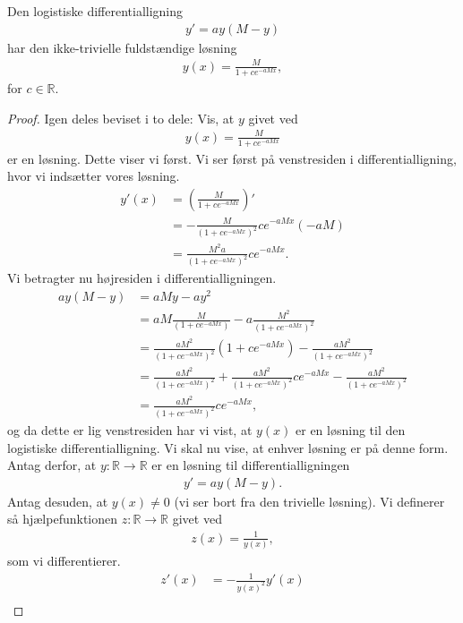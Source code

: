 \begin{setn}
	Den logistiske differentialligning
	\begin{align*}
		y' = ay(M-y)
	\end{align*}
	har den ikke-trivielle fuldstændige løsning
	\begin{align*}
		y(x) = \frac{M}{1+ce^{-aMx}},
	\end{align*}
	for $c\in \mathbb{R}$. 
\end{setn}
\begin{proof}
	Igen deles beviset i to dele: Vis, at $y$ givet ved
	\begin{align*}
		y(x) = \frac{M}{1+ce^{-aMx}}
	\end{align*}
	er en løsning. Dette viser vi først. Vi ser først på venstresiden i differentialligning, hvor vi indsætter vores løsning.
	\begin{align*}
		y'(x) &= \left( \frac{M}{1+ce^{-aMx}}\right)'\\
		&= -\frac{M}{(1+ce^{-aMx})^2}ce^{-aMx}(-aM)\\
		&= \frac{M^2a}{(1+ce^{-aMx})^2}ce^{-aMx}.
	\end{align*}
	Vi betragter nu højresiden i differentialligningen.
	\begin{align*}
		ay(M-y) &= aMy - ay^2 \\
		&= aM\frac{M}{(1+ce^{-aMx})} - a\frac{M^2}{(1+ce^{-aMx})^2}\\
		&= \frac{aM^2}{(1+ce^{-aMx})^2}(1+ce^{-aMx}) - \frac{aM^2}{(1+ce^{-aMx})^2} \\
		&= \frac{aM^2}{(1+ce^{-aMx})^2} + \frac{aM^2}{(1+ce^{-aMx})^2}ce^{-aMx} - \frac{aM^2}{(1+ce^{-aMx})^2} \\
		&= \frac{aM^2}{(1+ce^{-aMx})^2}ce^{-aMx},
	\end{align*}
	og da dette er lig venstresiden har vi vist, at $y(x)$ er en løsning til den logistiske differentialligning.
	Vi skal nu vise, at enhver løsning er på denne form. 	Antag derfor, at $y:\mathbb{R} \to \mathbb{R}$ er en løsning til differentialligningen
	\begin{align*}
		y' = ay(M-y).
	\end{align*}
	Antag desuden, at $y(x)\neq 0$ (vi ser bort fra den trivielle løsning). Vi definerer så hjælpefunktionen $z:\mathbb{R} \to \mathbb{R}$ givet ved
	\begin{align*}
		z(x) = \frac{1}{y(x)},
	\end{align*}
	som vi differentierer.
	\begin{align*}
		z'(x) &= -\frac{1}{y(x)^2}y'(x)\\

\end{align*}
\end{proof}
